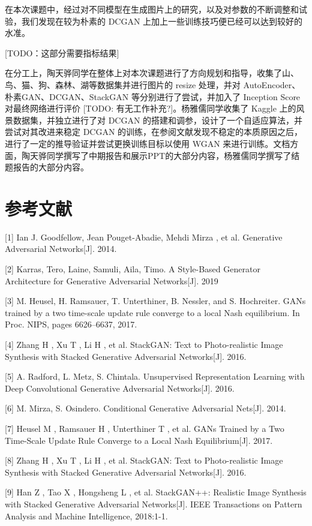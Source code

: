 \documentclass{article}
\begin{document}
\begin{CJK*}{UTF8}{gbsn}
在本次课题中，经过对不同模型在生成图片上的研究，以及对参数的不断调整和试验，我们发现在较为朴素的 DCGAN 上加上一些训练技巧便已经可以达到较好的水准。

[TODO：这部分需要指标结果]

  在分工上，陶天骅同学在整体上对本次课题进行了方向规划和指导，收集了山、鸟、猫、狗、森林、湖等数据集并进行图片的 resize 处理，并对 AutoEncoder、朴素GAN、DCGAN、StackGAN 等分别进行了尝试，并加入了 Inception Score 对最终网络进行评价 [TODO: 有无工作补充?]。杨雅儒同学收集了 Kaggle 上的风景数据集，并独立进行了对 DCGAN 的搭建和调参，设计了一个自适应算法，并尝试对其改进来稳定 DCGAN 的训练，在参阅文献发现不稳定的本质原因之后，进行了一定的推导验证并尝试更换训练目标以使用 WGAN 来进行训练。文档方面，陶天骅同学撰写了中期报告和展示PPT的大部分内容，杨雅儒同学撰写了结题报告的大部分内容。

\section*{参考文献}

\small

[1] Ian J. Goodfellow, Jean Pouget-Abadie, Mehdi Mirza , et al. Generative Adversarial Networks[J]. 2014.

[2] Karras, Tero, Laine, Samuli, Aila, Timo. A Style-Based Generator Architecture for Generative Adversarial Networks[J]. 2019

[3] M. Heusel, H. Ramsauer, T. Unterthiner, B. Nessler, and S. Hochreiter. GANs trained by a two time-scale update rule converge to a local Nash equilibrium. In Proc. NIPS, pages 6626–6637, 2017.

[4] Zhang H , Xu T , Li H , et al. StackGAN: Text to Photo-realistic Image Synthesis with Stacked Generative Adversarial Networks[J]. 2016.

[5] A. Radford, L. Metz, S. Chintala. Unsupervised Representation Learning with Deep Convolutional Generative Adversarial Networks[J]. 2016.

[6] M. Mirza, S. Osindero. Conditional Generative Adversarial Nets[J]. 2014.

[7] Heusel M , Ramsauer H , Unterthiner T , et al. GANs Trained by a Two Time-Scale Update Rule Converge to a Local Nash Equilibrium[J]. 2017.

[8] Zhang H , Xu T , Li H , et al. StackGAN: Text to Photo-realistic Image Synthesis with Stacked Generative Adversarial Networks[J]. 2016.

[9] Han Z , Tao X , Hongsheng L , et al. StackGAN++: Realistic Image Synthesis with Stacked Generative Adversarial Networks[J]. IEEE Transactions on Pattern Analysis and Machine Intelligence, 2018:1-1.


\end{CJK*}
\end{document}
